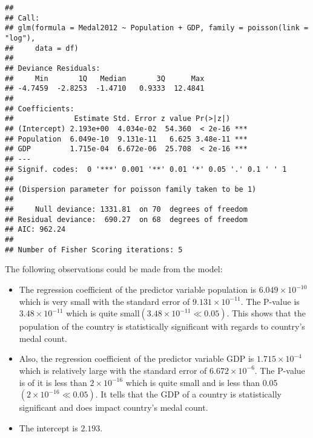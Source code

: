 \documentclass[
]{article}
\newenvironment{Shaded}{\begin{snugshade}}{\end{snugshade}}
\newcommand{\AttributeTok}[1]{\textcolor[rgb]{0.77,0.63,0.00}{#1}}
\newcommand{\CommentTok}[1]{\textcolor[rgb]{0.56,0.35,0.01}{\textit{#1}}}
\newcommand{\DecValTok}[1]{\textcolor[rgb]{0.00,0.00,0.81}{#1}}
\newcommand{\FloatTok}[1]{\textcolor[rgb]{0.00,0.00,0.81}{#1}}
\newcommand{\FunctionTok}[1]{\textcolor[rgb]{0.00,0.00,0.00}{#1}}
\newcommand{\NormalTok}[1]{#1}
\newcommand{\OtherTok}[1]{\textcolor[rgb]{0.56,0.35,0.01}{#1}}
\newcommand{\SpecialCharTok}[1]{\textcolor[rgb]{0.00,0.00,0.00}{#1}}
\providecommand{\tightlist}{%
  \setlength{\itemsep}{0pt}\setlength{\parskip}{0pt}}
\begin{document}
\begin{verbatim}
## 
## Call:
## glm(formula = Medal2012 ~ Population + GDP, family = poisson(link = "log"), 
##     data = df)
## 
## Deviance Residuals: 
##     Min       1Q   Median       3Q      Max  
## -4.7459  -2.8253  -1.4710   0.9333  12.4841  
## 
## Coefficients:
##              Estimate Std. Error z value Pr(>|z|)    
## (Intercept) 2.193e+00  4.034e-02  54.360  < 2e-16 ***
## Population  6.049e-10  9.131e-11   6.625 3.48e-11 ***
## GDP         1.715e-04  6.672e-06  25.708  < 2e-16 ***
## ---
## Signif. codes:  0 '***' 0.001 '**' 0.01 '*' 0.05 '.' 0.1 ' ' 1
## 
## (Dispersion parameter for poisson family taken to be 1)
## 
##     Null deviance: 1331.81  on 70  degrees of freedom
## Residual deviance:  690.27  on 68  degrees of freedom
## AIC: 962.24
## 
## Number of Fisher Scoring iterations: 5
\end{verbatim}

The following observations could be made from the model:

\begin{itemize}
\tightlist
\item
  The regression coefficient of the predictor variable population is
  \(6.049 \times 10^{-10}\) which is very small with the standard error
  of \(9.131 \times 10^{-11}\). The P-value is \(3.48 \times 10^{-11}\)
  which is quite small\((3.48 \times 10^{-11} \ll 0.05)\). This shows
  that the population of the country is statistically significant with
  regards to country's medal count.
\item
  Also, the regression coefficient of the predictor variable GDP is
  \(1.715 \times 10^{−4}\) which is relatively large with the standard
  error of \(6.672 \times 10^{-6}\). The P-value is of it is less than
  \(2 \times 10^{-16}\) which is quite small and is less than
  0.05\((2 \times 10^{-16} \ll 0.05)\). It tells that the GDP of a
  country is statistically significant and does impact country's medal
  count.
\item
  The intercept is \(2.193\).
\end{itemize}

\begin{Shaded}
\end{Shaded}
\end{document}
